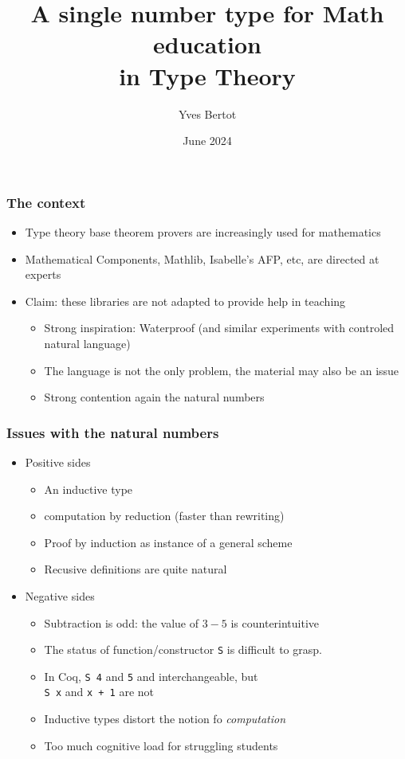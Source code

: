 \documentclass[compress]{beamer}
\title{A single number type for Math education\\in Type Theory}
\author{Yves Bertot}
\date{June 2024}
\begin{document}
\maketitle
\begin{frame}
\frametitle{The context}
\begin{itemize}
\item Type theory base theorem provers are increasingly used for mathematics
\item Mathematical Components, Mathlib, Isabelle's AFP, etc,
are directed at experts
\item Claim: these libraries are not adapted to provide help in teaching
\begin{itemize}
\item Strong inspiration: Waterproof (and similar experiments with controled natural language)
\item The language is not the only problem, the material may also be an issue
\item Strong contention again the natural numbers
\end{itemize}
\end{itemize}
\end{frame}
\begin{frame}
\frametitle{Issues with the natural numbers}
\begin{itemize}
\item Positive sides
\begin{itemize}
\item An inductive type
\item computation by reduction (faster than rewriting)
\item Proof by induction as instance of a general scheme
\item Recusive definitions are quite natural
\end{itemize}
\item Negative sides
\begin{itemize}
\item Subtraction is odd: the value of \(3-5\) is counterintuitive
\item The status of function/constructor {\tt S} is difficult to grasp.
\item In Coq, {\tt S 4} and {\tt 5} and interchangeable,
   but\\ {\tt S x} and {\tt x + 1} are not
\item Inductive types distort the notion fo {\sl computation}
\item Too much cognitive load for struggling students
\end{itemize}
\end{itemize}
\end{frame}
\end{document}
